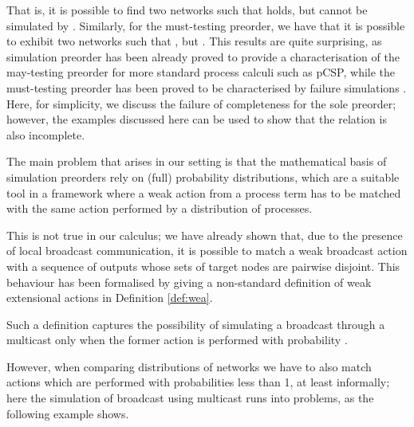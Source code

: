 \documentclass{LMCS}
\begin{document}
That is, it is possible to find two networks 
such that  holds, but  cannot be simulated
by . 
Similarly, for the must-testing preorder, we have that 
it is possible to exhibit two networks  
such that , but . 
This results are quite surprising, as simulation preorder has been
already proved to provide a characterisation of the may-testing
preorder for more standard process calculi such as pCSP, 
while the must-testing preorder has been proved to be characterised 
by failure simulations \cite{DGHM09full}. 
Here, for simplicity, we discuss the failure of completeness 
for the sole  preorder; however, the examples discussed 
here can be used to show that the relation  is also 
incomplete.
  
  The main problem that arises in our setting is that the  
  mathematical basis of simulation preorders rely on (full) probability distributions, which are a 
  suitable tool in a framework where a weak action from a process term has to be matched with the same 
  action performed by a distribution of processes.
  
  This is not true in our calculus; we have already shown that, due to
  the presence of local broadcast communication, it is possible to
  match a weak broadcast action with a sequence of outputs whose sets
  of target nodes are pairwise disjoint. This behaviour has been
  formalised by giving a non-standard  definition of weak extensional
  actions in Definition \ref{def:wea}. 
  
  Such a definition 
  captures the possibility of simulating a broadcast through a
  multicast only when the former action is performed with probability
  .
  
  However, when comparing distributions of networks we have to
also match actions which are performed with probabilities less than 1, at least
informally; here the simulation of broadcast using multicast runs into problems,
as the following example shows.
\end{document}

